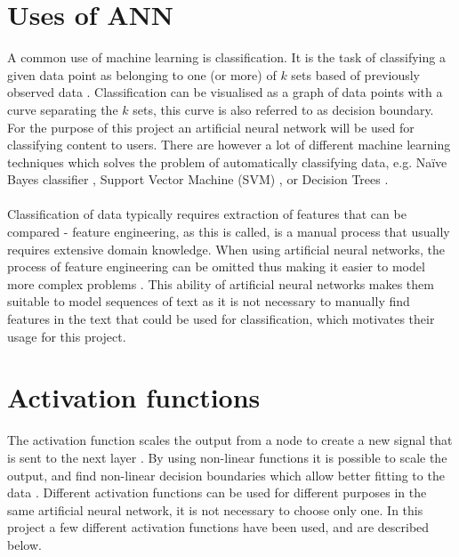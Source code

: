 \section{Uses of ANN}
A common use of machine learning is classification. It is the task of classifying a given data point as belonging to one (or more) of $k$ sets based of previously observed data \parencite{Michie94machinelearning}. Classification can be visualised as a graph of data points with a curve separating the $k$ sets, this curve is also referred to as decision boundary. For the purpose of this project an artificial neural network will be used for classifying content to users. There are however a lot of different machine learning techniques which solves the problem of automatically classifying data, e.g. Naïve Bayes classifier \parencite{rish2001empirical}, Support Vector Machine (SVM) \parencite{boser1992training, cortes1995support}, or Decision Trees \parencite{source}.
\\\\
Classification of data typically requires extraction of features that can be compared - feature engineering, as this is called, is a manual process that usually requires extensive domain knowledge. When using artificial neural networks, the process of feature engineering can be omitted  thus making it easier to model more complex problems \parencite{nlp2011ronan, lecun2015deep}. This ability of artificial neural networks makes them suitable to model sequences of text as it is not necessary to manually find features in the text that could be used for classification, which motivates their usage for this project.


\section{Activation functions}\label{activationfunction}
The activation function scales the output from a node to create a new signal that is sent to the next layer \parencite{basheer2000artificial}. By using non-linear functions it is possible to scale the output, and find non-linear decision boundaries which allow better fitting to the data \parencite{lippmann1987introduction, basheer2000artificial}. Different activation functions can be used for different purposes in the same artificial neural network, it is not necessary to choose only one. In this project a few different activation functions have been used, and are described below.

